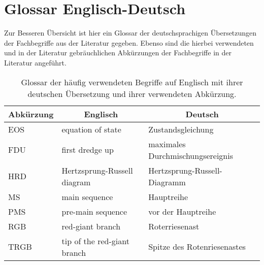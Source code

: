 \chapter{Glossar Englisch-Deutsch
\label{sec:glossar}}

Zur Besseren Übersicht ist hier ein Glossar der deutschsprachigen Übersetzungen der Fachbegriffe aus der Literatur gegeben. 
Ebenso sind die hierbei verwendeten und in der Literatur gebräuchlichen Abkürzungen der Fachbegriffe in der Literatur angeführt.

\vspace{5mm}

{\centering
\begin{table}[h!]
\caption{Glossar der häufig verwendeten Begriffe auf Englisch mit ihrer deutschen Übersetzung und ihrer verwendeten Abkürzung.}
\label{tab:glossar}
\tabcolsep=10pt
\hfill

\begin{tabular}{lll}

\hline\hline
\multicolumn{1}{c}{Abkürzung} & 
\multicolumn{1}{c}{Englisch} & 
\multicolumn{1}{c}{Deutsch} \\



\hline
EOS & equation of state & Zustandsgleichung \\
FDU & first dredge up & maximales Durchmischungsereignis \\
HRD & Hertzsprung-Russell diagram & Hertzsprung-Russell-Diagramm \\
MS & main sequence & Hauptreihe \\
PMS & pre-main sequence & vor der Hauptreihe \\
RGB & red-giant branch & Roterriesenast\\
TRGB & tip of the red-giant branch & Spitze des Rotenriesenastes\\
\hline
\end{tabular} \hfill~
\end{table}

\par}
